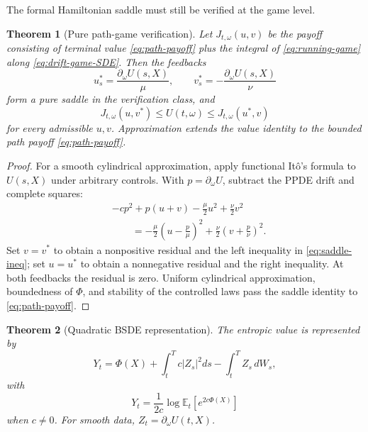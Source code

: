 \documentclass[11pt,reqno]{amsart}
\newtheorem{theorem}{Theorem}[section]
\theoremstyle{definition}
\theoremstyle{remark}
\newcommand{\E}{\mathbb E}
\newcommand{\abs}[1]{\left\lvert #1\right\rvert}
\begin{document}
The formal Hamiltonian saddle must still be verified at the game level.

\begin{theorem}[Pure path-game verification]\label{thm:path-game}
Let $J_{t,\omega}(u,v)$ be the payoff consisting of terminal value
\eqref{eq:path-payoff} plus the integral of \eqref{eq:running-game} along
\eqref{eq:drift-game-SDE}.  Then the feedbacks
\begin{equation}\label{eq:feedback-path}
 u_s^*=\frac{\partial_\omega U(s,X)}{\mu},
 \qquad
 v_s^*=-\frac{\partial_\omega U(s,X)}{\nu}
\end{equation}
form a pure saddle in the verification class, and
\begin{equation}\label{eq:saddle-ineq}
 J_{t,\omega}(u,v^*)\le U(t,\omega)\le
 J_{t,\omega}(u^*,v)
\end{equation}
for every admissible $u,v$.  Approximation extends the value identity to the
bounded path payoff \eqref{eq:path-payoff}.
\end{theorem}

\begin{proof}
For a smooth cylindrical approximation, apply functional It\^o's formula to
$U(s,X)$ under arbitrary controls.  With $p=\partial_\omega U$, subtract the
PPDE drift and complete squares:
\begin{align}\label{eq:complete-squares}
 &-cp^2+p(u+v)-\frac\mu2u^2+\frac\nu2v^2\\
 &\qquad=-\frac\mu2\left(u-\frac p\mu\right)^2
 +\frac\nu2\left(v+\frac p\nu\right)^2.
\end{align}
Set $v=v^*$ to obtain a nonpositive residual and the left inequality in
\eqref{eq:saddle-ineq}; set $u=u^*$ to obtain a nonnegative residual and the
right inequality.  At both feedbacks the residual is zero.  Uniform
cylindrical approximation, boundedness of $\Phi$, and stability of the
controlled laws pass the saddle identity to \eqref{eq:path-payoff}.
\end{proof}

\begin{theorem}[Quadratic BSDE representation]\label{thm:quadratic-BSDE}
The entropic value is represented by
\begin{equation}\label{eq:quadratic-BSDE}
 Y_t=\Phi(X)+\int_t^Tc\abs{Z_s}^2ds-
 \int_t^TZ_s\,dW_s,
\end{equation}
with
\begin{equation}\label{eq:entropic-BSDE-formula}
 Y_t=\frac1{2c}\log\E_t[e^{2c\Phi(X)}]
\end{equation}
when $c\ne0$.  For smooth data,
$Z_t=\partial_\omega U(t,X)$.
\end{theorem}
\end{document}
